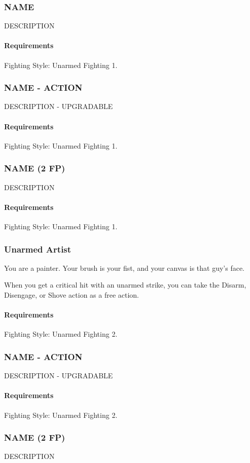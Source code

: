 \subsubsection{NAME} \label{feat::name}
    DESCRIPTION
    \paragraph{Requirements} Fighting Style: Unarmed Fighting 1.
\subsubsection{NAME - ACTION} \label{feat::name}
    DESCRIPTION - UPGRADABLE
    \paragraph{Requirements} Fighting Style: Unarmed Fighting 1.
\subsubsection{NAME (2 FP)} \label{feat::name}
    DESCRIPTION
    \paragraph{Requirements} Fighting Style: Unarmed Fighting 1.
\subsubsection{Unarmed Artist} \label{feat::unarmedartist}
    You are a painter.
    Your brush is your fist, and your canvas is that guy's face.

    When you get a critical hit with an unarmed strike, you can take the Disarm, Disengage, or Shove action as a free action.
    \paragraph{Requirements} Fighting Style: Unarmed Fighting 2.
\subsubsection{NAME - ACTION} \label{feat::name}
    DESCRIPTION - UPGRADABLE
    \paragraph{Requirements} Fighting Style: Unarmed Fighting 2.
\subsubsection{NAME (2 FP)} \label{feat::name}
    DESCRIPTION

